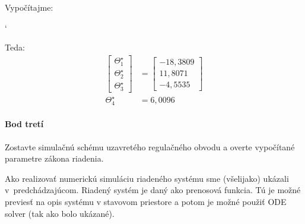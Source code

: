 \documentclass[a4paper, 10pt, ]{article}
\begin{document}
\noindent
Vypočítajme:
{\catcode`

}

\noindent
Teda:
\begin{subequations}
\begin{align}
	\begin{bmatrix}
    	  \Theta_1^\star \\
		  \Theta_2^\star \\
		  \Theta_3^\star
 	\end{bmatrix}
	&=
	\begin{bmatrix}
    	-18,3809 \\
    	11,8071 \\
    	-4,5535
  	\end{bmatrix} \\
	\Theta_4^\star &= 6,0096
\end{align}
\end{subequations}












\paragraph{Bod tretí}

\label{cast1bodtreti}

\smallskip

{\color{gray}

Zostavte simulačnú schému uzavretého regulačného obvodu a overte vypočítané parametre zákona riadenia.

}

\smallskip

\noindent
Ako realizovať numerickú simuláciu riadeného systému sme (všelijako) ukázali v~predchádzajúcom. Riadený systém je daný ako prenosová funkcia. Tú je možné previesť na opis systému v stavovom priestore a potom je možné použiť ODE solver (tak ako bolo ukázané).
\end{document}
